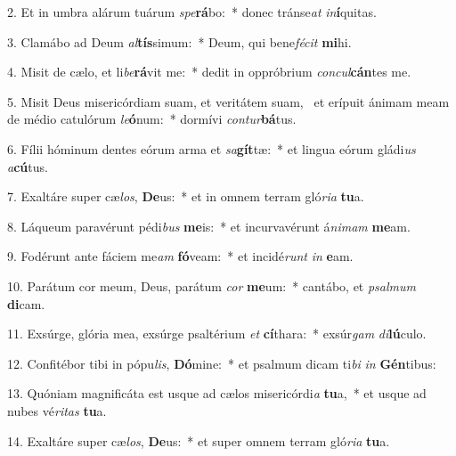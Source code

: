 2. Et in umbra alárum tuárum \textit{spe}\textbf{rá}bo:~*  donec tránse\textit{at} \textit{in}\textbf{í}quitas.\

3. Clamábo ad Deum \textit{al}\textbf{tís}simum:~*  Deum, qui bene\textit{fé}\textit{cit} \textbf{mi}hi.\

4. Misit de cælo, et li\textit{be}\textbf{rá}vit me:~*  dedit in oppróbrium \textit{con}\textit{cul}\textbf{cán}tes me.\

5. Misit Deus misericórdiam suam, et veritátem suam, \dag\  et erípuit ánimam meam de médio catulórum \textit{le}\textbf{ó}num:~*  dormívi \textit{con}\textit{tur}\textbf{bá}tus.\

6. Fílii hóminum dentes eórum arma et \textit{sa}\textbf{gít}tæ:~*  et lingua eórum gládi\textit{us} \textit{a}\textbf{cú}tus.\

7. Exaltáre super cæ\textit{los}, \textbf{De}us:~*  et in omnem terram gló\textit{ri}\textit{a} \textbf{tu}a.\

8. Láqueum paravérunt pédi\textit{bus} \textbf{me}is:~*  et incurvavérunt á\textit{ni}\textit{mam} \textbf{me}am.\

9. Fodérunt ante fáciem me\textit{am} \textbf{fó}veam:~*  et incidé\textit{runt} \textit{in} \textbf{e}am.\

10. Parátum cor meum, Deus, parátum \textit{cor} \textbf{me}um:~*  cantábo, et \textit{psal}\textit{mum} \textbf{di}cam.\

11. Exsúrge, glória mea, exsúrge psaltérium \textit{et} \textbf{cí}thara:~*  exsúr\textit{gam} \textit{di}\textbf{lú}culo.\

12. Confitébor tibi in pópu\textit{lis}, \textbf{Dó}mine:~*  et psalmum dicam ti\textit{bi} \textit{in} \textbf{Gén}tibus:\

13. Quóniam magnificáta est usque ad cælos misericórdi\textit{a} \textbf{tu}a,~*  et usque ad nubes vé\textit{ri}\textit{tas} \textbf{tu}a.\

14. Exaltáre super cæ\textit{los}, \textbf{De}us:~*  et super omnem terram gló\textit{ri}\textit{a} \textbf{tu}a.\

